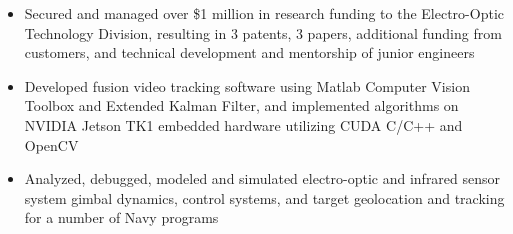 \begin{itemize} [leftmargin = \itemmargin]
	\item Secured and managed over \$1 million in research funding to the Electro-Optic Technology Division, resulting in 3 patents, 3 papers, additional funding from customers, and technical development and mentorship of junior engineers
	\item Developed fusion video tracking software using Matlab Computer Vision Toolbox and Extended Kalman Filter, and implemented algorithms on NVIDIA Jetson TK1 embedded hardware utilizing CUDA C/C++ and OpenCV
	
	\item Analyzed, debugged, modeled and simulated electro-optic and infrared sensor system gimbal dynamics, control systems, and target geolocation and tracking for a number of Navy programs
	
\end{itemize} 